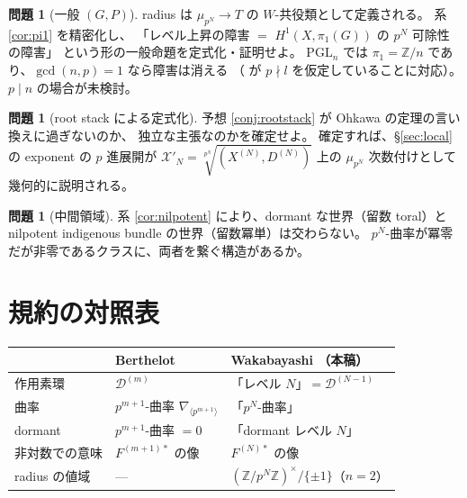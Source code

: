 \documentclass[a4paper,11pt]{ltjsarticle}
\theoremstyle{plain}
\theoremstyle{definition}
\newtheorem{question}[theorem]{問題}
\newcommand{\bbZ}{\mathbb{Z}}
\newcommand{\cD}{\mathcal{D}}
\begin{document}
\begin{question}[一般 $(G,P)$]\label{q:GP}
radius は $\mu_{p^N}\to T$ の $W$-共役類として定義される。
系 \ref{cor:pi1} を精密化し、
「レベル上昇の障害 $=$ $H^1(X,\pi_1(G))$ の $p^N$ 可除性の障害」
という形の一般命題を定式化・証明せよ。
$\mathrm{PGL}_n$ では $\pi_1=\bbZ/n$ であり、$\gcd(n,p)=1$ なら障害は消える
（\cite[Prop.~4.1.4]{Wak} が $p\nmid l$ を仮定していることに対応）。
$p\mid n$ の場合が未検討。
\end{question}

\begin{question}[root stack による定式化]\label{q:rootstack}
予想 \ref{conj:rootstack} が Ohkawa \cite{Ohk} の定理の言い換えに過ぎないのか、
独立な主張なのかを確定せよ。
確定すれば、\S\ref{sec:local} の exponent の $p$ 進展開が
$\mathcal{X}'_N=\sqrt[p^N]{(X^{(N)},D^{(N)})}$ 上の
$\mu_{p^N}$ 次数付けとして幾何的に説明される。
\end{question}

\begin{question}[中間領域]\label{q:middle}
系 \ref{cor:nilpotent} により、dormant な世界（留数 toral）と
nilpotent indigenous bundle の世界（留数冪単）は交わらない。
$p^N$-曲率が冪零だが非零であるクラスに、両者を繋ぐ構造があるか。
\end{question}

\appendix
\section{規約の対照表}

\begin{table}[htbp]
\centering
\begin{tabular}{lll}
\toprule
& Berthelot & Wakabayashi \cite{Wak}（本稿）\\
\midrule
作用素環 & $\cD^{(m)}$ & 「レベル $N$」$=\cD^{(N-1)}$\\
曲率 & $p^{m+1}$-曲率 $\nabla_{\langle p^{m+1}\rangle}$ & 「$p^N$-曲率」\\
dormant & $p^{m+1}$-曲率 $=0$ & 「dormant レベル $N$」\\
非対数での意味 & $F^{(m+1)*}$ の像 & $F^{(N)*}$ の像\\
radius の値域 & --- & $(\bbZ/p^N\bbZ)^\times/\{\pm1\}$（$n=2$）\\
\bottomrule
\end{tabular}
\end{table}
\end{document}
